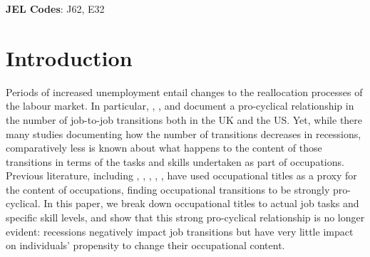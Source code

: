 \documentclass[11pt, oneside]{article}
\begin{document}
	\textbf{JEL Codes}: J62, E32
	
	\newpage
	\doublespacing
	\section{Introduction}
	\label{sec:Introduction}
	
	Periods of increased unemployment entail changes to the reallocation processes of the labour market. In particular,  \cite{Carrillo-Tudela2016},  \cite{MurphyTopel1987}, \cite{Moscarini2007} and \cite{Kambourov2008} document a pro-cyclical relationship in the number of job-to-job transitions both in the UK and the US. Yet, while there many studies documenting how the number of transitions decreases in recessions, comparatively less is known about what happens to the content of those transitions in terms of the tasks and skills undertaken as part of occupations. Previous literature, including \cite{MurphyTopel1987}, \cite{Moscarini2007}, \cite{Kambourov2008}, \cite{Carrillo-Tudela2014}, \cite{Carrillo-Tudela2016}, have used occupational titles as a proxy for the content of occupations, finding occupational transitions to be strongly pro-cyclical. 	
	In this paper, we break down occupational titles to actual job tasks and specific skill levels, and show that this strong pro-cyclical relationship is no longer evident: recessions negatively impact job transitions but have very little impact on individuals' propensity to change their occupational content. 
	
		\vspace{2mm}
	
\end{document}
